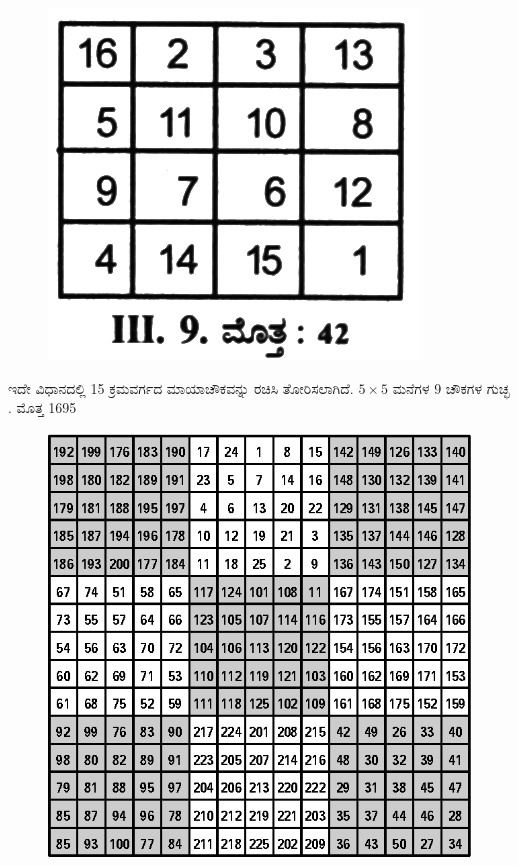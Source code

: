 	\begin{figure}[H]
	\includegraphics[scale=1.2]{src/figures/chap3/fig3-36.jpg}
	\end{figure}

	ಇದೇ ವಿಧಾನದಲ್ಲಿ 15 ಕ್ರಮವರ್ಗದ ಮಾಯಾಚೌಕವನ್ನು ರಚಿಸಿ ತೋರಿಸಲಾಗಿದೆ. $5 \times 5$ ಮನೆಗಳ 9 ಚೌಕಗಳ ಗುಚ್ಛ . ಮೊತ್ತ 1695
	\begin{figure}[H]
	\includegraphics[scale=1.25]{src/figures/chap3/fig3-37.eps}
	\end{figure}

